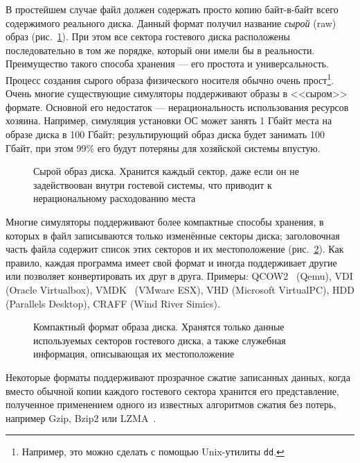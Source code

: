 В простейшем случае файл должен содержать просто копию байт-в-байт всего содержимого реального диска. Данный формат получил название \textit{сырой} (\abbr raw) образ (рис.~\ref{fig:raw}). При этом все сектора гостевого диска расположены последовательно в том же порядке, который они имели бы  в реальности. Преимущество такого способа хранения — его простота и универсальность. Процесс создания сырого образа физического носителя обычно очень прост\footnote{Например, это можно сделать с помощью Unix-утилиты \texttt{dd}.}. Очень многие существующие симуляторы поддерживают образы в <<сыром>> формате. Основной его недостаток — нерациональность использования ресурсов хозяина. Например, симуляция установки ОС может занять 1 Гбайт места на образе диска в 100 Гбайт; результирующий образ диска будет занимать 100 Гбайт, при этом 99\% его будут потеряны для хозяйской системы впустую.

\begin{figure}[htb]
    \centering
    \caption[Сырой образ диска]{Сырой образ диска. Хранится каждый сектор, даже если он не задействоован внутри гостевой системы, что приводит к нерациональному расходованию места}
    \label{fig:raw}
\end{figure}

Многие симуляторы поддерживают более компактные способы хранения, в которых в файл записываются только изменённые секторы диска; заголовочная часть файла содержит список этих секторов и их местоположение (рис.~\ref{fig:compat}). Как правило, каждая программа имеет свой формат и иногда поддерживает другие или позволяет конвертировать их друг в друга. Примеры: QCOW2~\cite{qcow2-format} (Qemu), VDI (Oracle Virtualbox), VMDK~\cite{vmdk} (VMware ESX), VHD (Microsoft VirtualPC), HDD (Parallels Desktop), CRAFF (Wind River Simics).

\begin{figure}[htb]
    \centering
    \caption[Компактный формат образа диска]{Компактный формат образа диска. Хранятся только данные используемых секторов гостевого диска, а также служебная информация, описывающая их местоположение}
    \label{fig:compat}
\end{figure}

Некоторые форматы поддерживают прозрачное сжатие записанных данных, когда вместо обычной копии каждого гостевого сектора хранится его представление, полученное применением одного из известных алгоритмов сжатия без потерь, например Gzip, Bzip2 или LZMA~\cite{sayood2002lossless}.

